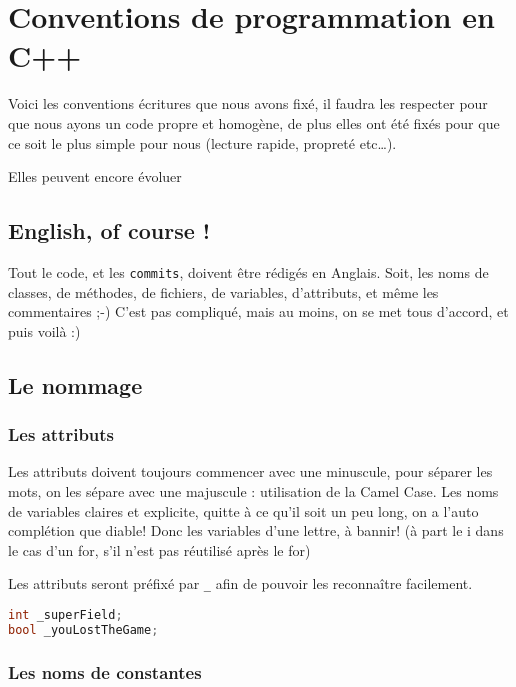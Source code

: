 \chapter{Conventions de programmation en C++}
Voici les conventions écritures que nous avons fixé, il faudra les
respecter pour que nous ayons un code propre et homogène, de plus elles
ont été fixés pour que ce soit le plus simple pour nous (lecture rapide,
propreté etc\ldots{}).

\begin{attention}
Elles peuvent encore évoluer
\end{attention}

\section{English, of course !}\label{english-of-course}

Tout le code, et les \texttt{commits}, doivent être rédigés en Anglais. Soit, les
noms de classes, de méthodes, de fichiers, de variables, d'attributs, et
même les commentaires ;-) C'est pas compliqué, mais au moins, on se met
tous d'accord, et puis voilà :)

\section{Le nommage}\label{le-nommage}

\subsection{Les attributs}\label{les-attributs}

Les attributs doivent toujours commencer avec une minuscule, pour
séparer les mots, on les sépare avec une majuscule : utilisation de la
Camel Case. Les noms de variables claires et explicite, quitte à ce
qu'il soit un peu long, on a l'auto complétion que diable! Donc les
variables d'une lettre, à bannir! (à part le i dans le cas d'un for,
s'il n'est pas réutilisé après le for)

Les attributs seront préfixé par \texttt{\_} afin de pouvoir les reconnaître
facilement.

\begin{lstlisting}[language=C++,numbers=none]
int _superField; 
bool _youLostTheGame;
\end{lstlisting}

\subsection{Les noms de constantes}\label{les-noms-de-constantes}

